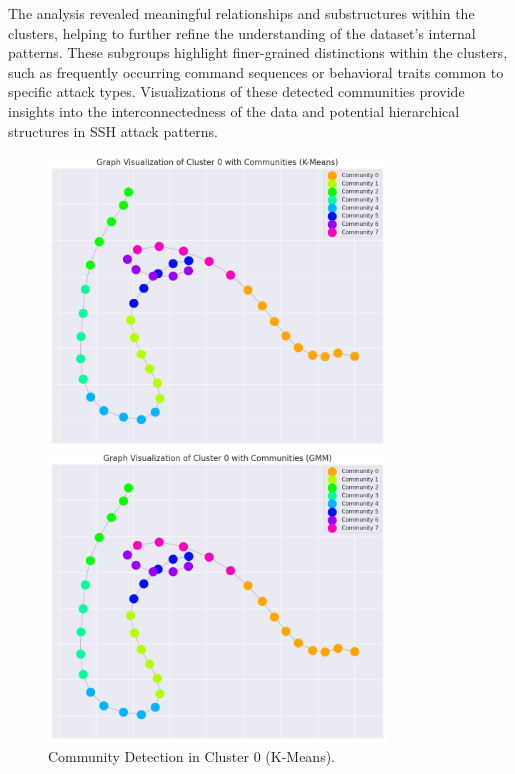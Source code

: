                 The analysis revealed meaningful relationships and substructures within the clusters, helping to further refine the understanding of the dataset's internal patterns. These subgroups highlight finer-grained distinctions within the clusters, such as frequently occurring command sequences or behavioral traits common to specific attack types. Visualizations of these detected communities provide insights into the interconnectedness of the data and potential hierarchical structures in SSH attack patterns.

                \begin{figure}[h]
                    \centering
                    \begin{minipage}[c]{0.47\textwidth}
                        \centering
                        \includegraphics[width=0.8\textwidth]{../figures/plots/section3/k-means_graph_visualization_of_cluster_0_with_communities.png}
                        \caption{Community Detection in Cluster 0 (K-Means).}
                        \label{fig:kmeans_graph}
                    \end{minipage}
                    \hfill
                    \begin{minipage}[c]{0.47\textwidth}
                        \centering
                        \includegraphics[width=0.8\textwidth]{../figures/plots/section3/gmm_graph_visualization_of_cluster_0_with_communities.png}

\end{minipage}
\end{figure}
